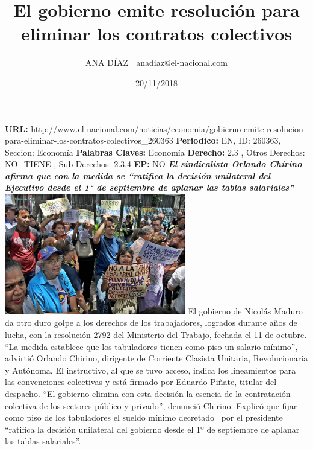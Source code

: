 \documentclass{article}%
\title{\textbf{El gobierno emite resolución para eliminar los contratos colectivos}}%
\author{ANA DÍAZ | anadiaz@el{-}nacional.com}%
\date{20/11/2018}%
\begin{document}
%
\normalsize%
\maketitle%
\textbf{URL: }%
http://www.el{-}nacional.com/noticias/economia/gobierno{-}emite{-}resolucion{-}para{-}eliminar{-}los{-}contratos{-}colectivos\_260363\newline%
%
\textbf{Periodico: }%
EN, %
ID: %
260363, %
Seccion: %
Economía\newline%
%
\textbf{Palabras Claves: }%
Economía\newline%
%
\textbf{Derecho: }%
2.3%
, Otros Derechos: %
NO\_TIENE%
, Sub Derechos: %
2.3.4%
\newline%
%
\textbf{EP: }%
NO\newline%
\newline%
%
\textbf{\textit{El sindicalista Orlando Chirino afirma que con la medida se “ratifica la decisión unilateral del Ejecutivo desde el 1° de septiembre de aplanar las tablas salariales”}}%
\newline%
\newline%
%
\includegraphics[width=300px]{38.jpg}%
\newline%
%
El gobierno de Nicolás Maduro da otro duro golpe a los derechos de los trabajadores, logrados durante años de lucha, con la resolución 2792 del Ministerio del Trabajo, fechada el 11 de octubre. “La medida establece que los tabuladores tienen como piso un salario mínimo”, advirtió Orlando Chirino, dirigente de Corriente Clasista Unitaria, Revolucionaria y Autónoma.%
\newline%
%
El instructivo, al que se tuvo acceso, indica los lineamientos para las convenciones colectivas y está firmado por Eduardo Piñate, titular del despacho. “El gobierno elimina con esta decisión la esencia de la contratación colectiva de los sectores público y privado”, denunció Chirino.%
\newline%
%
Explicó que fijar como piso de los tabuladores el sueldo mínimo decretado ~por el presidente “ratifica la decisión unilateral del gobierno desde el 1º de septiembre de aplanar las tablas salariales”.%
\end{document}
